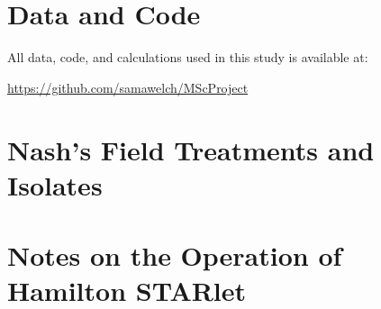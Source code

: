 \documentclass[review,12pt]{elsarticle}
\begin{document}




\begin{appendices}

\section{Data and Code}
\label{A:1}

All data, code, and calculations used in this study is available at: 

\url{https://github.com/samawelch/MScProject}

\section{Nash's Field Treatments and Isolates}
\label{A:2}


\section{Notes on the Operation of Hamilton STARlet}
\label{A:3}
\end{appendices}
\end{document}
